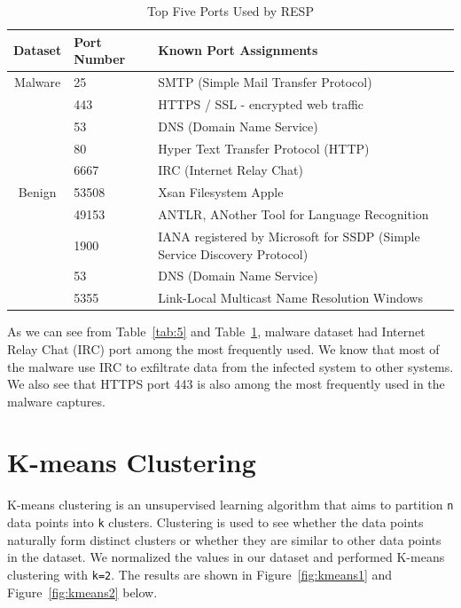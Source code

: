 \begin{table}[!htb]
	\caption{Top Five Ports Used by RESP\label{tab:6}}
	\begin{center}
		\begin{tabular}{c|p{}|p{}}\hline\hline
			Dataset & Port Number & \multicolumn{1}{l}{Known Port Assignments} \\ \hline
			Malware & 25 & SMTP (Simple Mail Transfer Protocol) \\
			& 443	&  HTTPS / SSL - encrypted web traffic\\
			& 53	&  DNS (Domain Name Service)\\
			& 80	&  Hyper Text Transfer Protocol (HTTP) \\
			& 6667 &  IRC (Internet Relay Chat) \\ \hline
			Benign & 53508  &  Xsan Filesystem Apple\\
			& 49153 &  ANTLR, ANother Tool for Language Recognition\\
			& 1900 &  IANA registered by Microsoft for SSDP (Simple Service Discovery Protocol)\\
			& 53 &  DNS (Domain Name Service)\\
			& 5355 &  Link-Local Multicast Name Resolution Windows\\
			\hline\hline
		\end{tabular}
	\end{center}
\end{table}

As we can see from Table~\ref{tab:5} and Table~\ref{tab:6}, malware dataset had Internet Relay Chat (IRC) port among the most frequently used. We know that most of the malware use IRC to exfiltrate data from the infected system to other systems. We also see that HTTPS port 443 is also among the most frequently used in the malware captures.

\pagebreak

\section{K-means Clustering}

K-means clustering is an unsupervised learning algorithm that aims to partition \verb|n| data points into \verb|k| clusters. Clustering is used to see whether the data points naturally form distinct clusters or whether they are similar to other data points in the dataset. We normalized the values in our dataset and performed K-means clustering with \verb|k=2|. The results are shown in Figure~\ref{fig:kmeans1} and Figure~\ref{fig:kmeans2} below.

